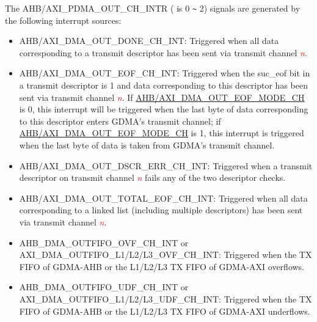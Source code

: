 \documentclass[main\_\_EN.tex]{subfiles}
\begin{document}
The AHB/AXI\_PDMA\_OUT\_CH\_INTR ( is 0 \verb+~+ 2) signals are generated by the following interrupt sources:

\begin{itemize}
    \item \label{int:GDMAOUTDONEINT}AHB/AXI\_DMA\_OUT\_DONE\_CH\_INT: Triggered when all data corresponding to a transmit descriptor has been sent via transmit channel \textcolor{red}{\it{n}}.
    \item \label{int:GDMAOUTEOFINT}AHB/AXI\_DMA\_OUT\_EOF\_CH\_INT: Triggered when the suc\_eof bit in a transmit descriptor is 1 and data corresponding to this descriptor has been sent via transmit channel \textcolor{red}{\it{n}}. If \hyperref[fielddesc:AHBDMAOUTEOFMODECHN]{AHB/AXI\_DMA\_OUT\_EOF\_MODE\_CH} is 0, this interrupt will be triggered when the last byte of data corresponding to this descriptor enters GDMA's transmit channel; if \hyperref[fielddesc:AHBDMAOUTEOFMODECHN]{AHB/AXI\_DMA\_OUT\_EOF\_MODE\_CH} is 1, this interrupt is triggered when the last byte of data is taken from GDMA's transmit channel.
    \item \label{int:GDMAOUTDSCRERRINT}AHB/AXI\_DMA\_OUT\_DSCR\_ERR\_CH\_INT: Triggered when a transmit descriptor on transmit channel \textcolor{red}{\it{n}} fails any of the two descriptor checks.
    \item \label{int:GDMAOUTTOTALEOFINT}AHB/AXI\_DMA\_OUT\_TOTAL\_EOF\_CH\_INT: Triggered when all data corresponding to a linked list (including multiple descriptors) has been sent via transmit channel \textcolor{red}{\it{n}}.
    \item \label{int:GDMAOUTFIFOOVFINT}AHB\_DMA\_OUTFIFO\_OVF\_CH\_INT or AXI\_DMA\_OUTFIFO\_L1/L2/L3\_OVF\_CH\_INT: Triggered when the TX FIFO of GDMA-AHB or the L1/L2/L3 TX FIFO of GDMA-AXI overflows.
    \item \label{int:GDMAOUTFIFOUDFINT}AHB\_DMA\_OUTFIFO\_UDF\_CH\_INT or AXI\_DMA\_OUTFIFO\_L1/L2/L3\_UDF\_CH\_INT: Triggered when the TX FIFO of GDMA-AHB or the L1/L2/L3 TX FIFO of GDMA-AXI underflows.
\end{itemize}
\end{document}
